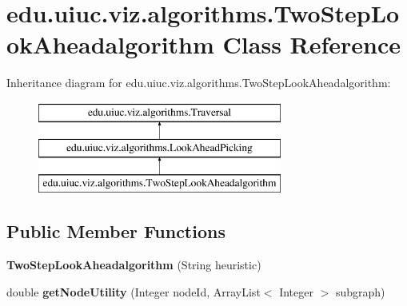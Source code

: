 \hypertarget{classedu_1_1uiuc_1_1viz_1_1algorithms_1_1_two_step_look_aheadalgorithm}{}\section{edu.\+uiuc.\+viz.\+algorithms.\+Two\+Step\+Look\+Aheadalgorithm Class Reference}
\label{classedu_1_1uiuc_1_1viz_1_1algorithms_1_1_two_step_look_aheadalgorithm}
Inheritance diagram for edu.\+uiuc.\+viz.\+algorithms.\+Two\+Step\+Look\+Aheadalgorithm\+:\begin{figure}[H]
\begin{center}
\leavevmode
\includegraphics[height=3.000000cm]{classedu_1_1uiuc_1_1viz_1_1algorithms_1_1_two_step_look_aheadalgorithm}
\end{center}
\end{figure}
\subsection*{Public Member Functions}
\begin{DoxyCompactItemize}
\item 
\mbox{\label{classedu_1_1uiuc_1_1viz_1_1algorithms_1_1_two_step_look_aheadalgorithm_a69514f0906b2ef05a61df6b71851cc36}} 
{\bfseries Two\+Step\+Look\+Aheadalgorithm} (String heuristic)
\item 
\mbox{\label{classedu_1_1uiuc_1_1viz_1_1algorithms_1_1_two_step_look_aheadalgorithm_aaa82f1c536accf69d09b51a965d137f3}} 
double {\bfseries get\+Node\+Utility} (Integer node\+Id, Array\+List$<$ Integer $>$ subgraph)
\end{DoxyCompactItemize}

